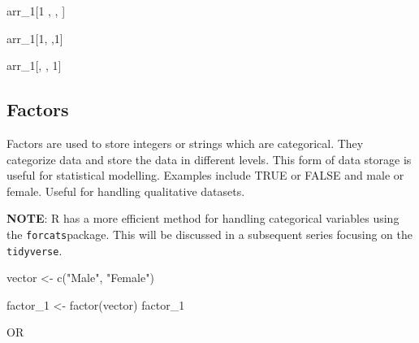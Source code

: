 \documentclass[
  letterpaper,
  DIV=11,
  numbers=noendperiod]{scrreprt}
\newenvironment{Shaded}{}{}
\newcommand{\DecValTok}[1]{\textcolor[rgb]{0.00,0.36,0.77}{#1}}
\newcommand{\FunctionTok}[1]{\textcolor[rgb]{0.44,0.26,0.76}{#1}}
\newcommand{\NormalTok}[1]{\textcolor[rgb]{0.14,0.16,0.18}{#1}}
\newcommand{\OtherTok}[1]{\textcolor[rgb]{0.44,0.26,0.76}{#1}}
\newcommand{\StringTok}[1]{\textcolor[rgb]{0.01,0.18,0.38}{#1}}
\begin{document}
\begin{Shaded}
\begin{Highlighting}[]
\NormalTok{arr\_1[}\DecValTok{1}\NormalTok{ ,  , ]}
\end{Highlighting}
\end{Shaded}

\begin{Shaded}
\begin{Highlighting}[]
\NormalTok{arr\_1[}\DecValTok{1}\NormalTok{, ,}\DecValTok{1}\NormalTok{]}
\end{Highlighting}
\end{Shaded}

\begin{Shaded}
\begin{Highlighting}[]
\NormalTok{arr\_1[, , }\DecValTok{1}\NormalTok{]}
\end{Highlighting}
\end{Shaded}

\subsection{Factors}\label{factors}

Factors are used to store integers or strings which are categorical.
They categorize data and store the data in different levels. This form
of data storage is useful for statistical modelling. Examples include
TRUE or FALSE and male or female. Useful for handling qualitative
datasets.

\textbf{NOTE}: R has a more efficient method for handling categorical
variables using the \texttt{forcats}package. This will be discussed in a
subsequent series focusing on the \texttt{tidyverse}.

\begin{Shaded}
\begin{Highlighting}[]
\NormalTok{vector }\OtherTok{\textless{}{-}} \FunctionTok{c}\NormalTok{(}\StringTok{"Male"}\NormalTok{, }\StringTok{"Female"}\NormalTok{)}
\end{Highlighting}
\end{Shaded}

\begin{Shaded}
\begin{Highlighting}[]
\NormalTok{factor\_1 }\OtherTok{\textless{}{-}} \FunctionTok{factor}\NormalTok{(vector) }
\NormalTok{factor\_1}
\end{Highlighting}
\end{Shaded}

OR
\end{document}
